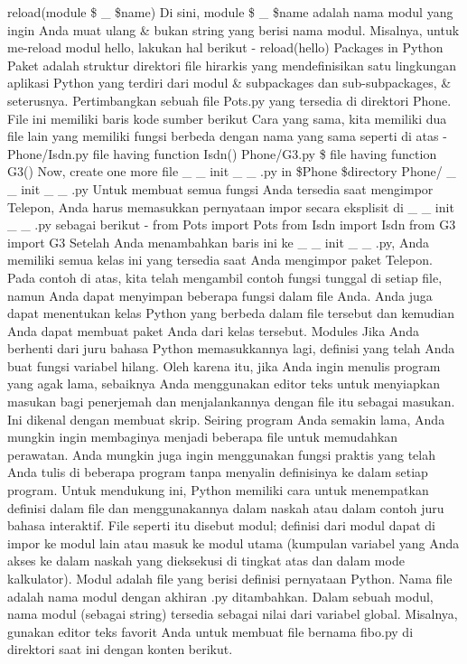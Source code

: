 reload(module \$  \_  \$name) 
Di sini, module \$  \_  \$name adalah nama modul yang ingin Anda muat ulang \& bukan string yang berisi nama modul. Misalnya, untuk me-reload modul hello, lakukan hal berikut -  
reload(hello) 
Packages in Python 
Paket adalah struktur direktori file hirarkis yang mendefinisikan satu lingkungan aplikasi Python yang terdiri dari modul \& subpackages dan sub-subpackages, \& seterusnya.  
Pertimbangkan sebuah file Pots.py yang tersedia di direktori Phone. File ini memiliki baris kode sumber berikut Cara yang sama, kita memiliki dua file lain yang memiliki fungsi berbeda dengan nama yang sama seperti di atas -  
Phone/Isdn.py file having function Isdn()  
Phone/G3.py \$  file having function G3() 
Now, create one more file   \_   \_  init  \_ \_  .py in \$Phone  \$directory   
Phone/  \_   \_  init  \_  \_  .py  
Untuk membuat semua fungsi Anda tersedia saat mengimpor Telepon, Anda harus memasukkan pernyataan impor secara eksplisit di    \_     \_  init   \_  \_  .py sebagai berikut - 
 from Pots import Pots 
 from Isdn import Isdn  
 from G3 import G3 Setelah Anda menambahkan baris ini ke \_  \_  init  \_  \_  .py, Anda memiliki semua kelas ini yang tersedia saat Anda mengimpor paket Telepon. 
Pada contoh di atas, kita telah mengambil contoh fungsi tunggal di setiap file, namun Anda dapat menyimpan beberapa fungsi dalam file Anda. Anda juga dapat menentukan kelas Python yang berbeda dalam file tersebut dan kemudian Anda dapat membuat paket Anda dari kelas tersebut.
Modules  
Jika Anda berhenti dari juru bahasa Python  memasukkannya lagi, definisi yang telah Anda buat fungsi  variabel hilang. Oleh karena itu, jika Anda ingin menulis program yang agak lama, sebaiknya Anda menggunakan editor teks untuk menyiapkan masukan bagi penerjemah dan menjalankannya dengan file itu sebagai masukan. Ini dikenal dengan membuat skrip. Seiring program Anda semakin lama, Anda mungkin ingin membaginya menjadi beberapa file untuk memudahkan perawatan. Anda mungkin juga ingin menggunakan fungsi praktis yang telah Anda tulis di beberapa program tanpa menyalin definisinya ke dalam setiap program.  
Untuk mendukung ini, Python memiliki cara untuk menempatkan definisi dalam file dan menggunakannya dalam naskah atau dalam contoh juru bahasa interaktif. File seperti itu disebut modul; definisi dari modul dapat di impor ke modul lain atau masuk ke modul utama (kumpulan variabel yang Anda akses ke dalam naskah yang dieksekusi di tingkat atas dan dalam mode kalkulator).  
Modul adalah file yang berisi definisi  pernyataan Python. Nama file adalah nama modul dengan akhiran .py ditambahkan. Dalam sebuah modul, nama modul (sebagai string) tersedia sebagai nilai dari variabel global. Misalnya, gunakan editor teks favorit Anda untuk membuat file bernama fibo.py di direktori saat ini dengan konten berikut.  
